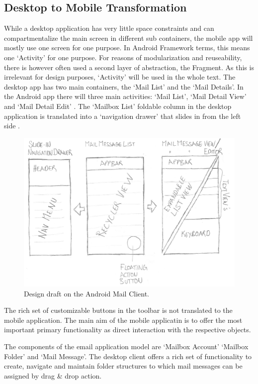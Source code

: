 \documentclass[a4paper,11pt,twoside]{article}
\begin{document}
\subsection{Desktop to Mobile Transformation} While a desktop application has
very little space constraints and can compartmentalize the main screen in
different sub containers, the mobile app will mostly use one screen for one
purpose. In Android Framework terms, this means one `Activity' for one purpose.
For reasons of modularization and reuseability, there is however often used a
second layer of abstraction, the Fragment. As this is irrelevant for design
purposes, `Activity' will be used in the whole text. The desktop app has two
main containers, the `Mail List' and the `Mail Details'.  In the Android app
there will three main activities: `Mail List',  `Mail Detail View' and `Mail
Detail Edit' \cite{fig:hand_design}. The `Mailbox List' foldable column in the
desktop application is translated into a `navigation drawer' that slides in from
the left side \cite{navigation_drawer}.

\begin{figure}
    \includegraphics[width=1\textwidth]{hand_design.png}
    \caption{Design draft on the Android Mail Client.}
    \label{fig:hand_design}
\end{figure}


The rich set of customizable buttons in the toolbar is not translated to the
mobile application. The main aim of the mobile applicatin is to offer the most
important primary functionality as direct interaction with the respective objects.


The components of the email application model are `Mailbox Account'
`Mailbox Folder' and `Mail Message'. The desktop client offers a rich set of
functionality to create, navigate and maintain folder structures to which mail
messages can be assigned by drag \& drop action.
\end{document}
